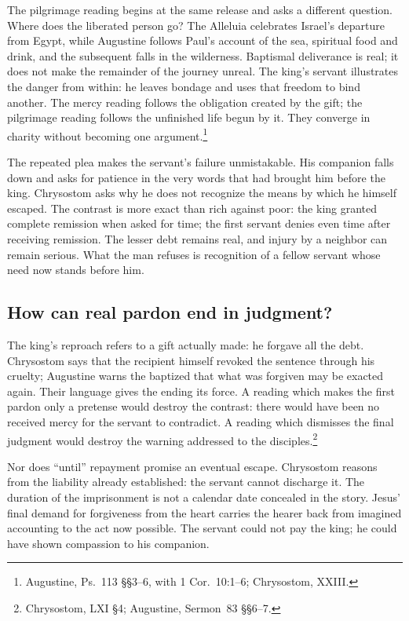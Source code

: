 The pilgrimage reading begins at the same release and asks a different question. Where does the liberated person go? The Alleluia celebrates Israel's departure from Egypt, while Augustine follows Paul's account of the sea, spiritual food and drink, and the subsequent falls in the wilderness. Baptismal deliverance is real; it does not make the remainder of the journey unreal. The king's servant illustrates the danger from within: he leaves bondage and uses that freedom to bind another. The mercy reading follows the obligation created by the gift; the pilgrimage reading follows the unfinished life begun by it. They converge in charity without becoming one argument.\footnote{Augustine, Ps.~113 \S\S3--6, with 1 Cor.~10:1--6; Chrysostom,  XXIII.}

The repeated plea makes the servant's failure unmistakable. His companion falls down and asks for patience in the very words that had brought him before the king. Chrysostom asks why he does not recognize the means by which he himself escaped. The contrast is more exact than rich against poor: the king granted complete remission when asked for time; the first servant denies even time after receiving remission. The lesser debt remains real, and injury by a neighbor can remain serious. What the man refuses is recognition of a fellow servant whose need now stands before him.

\subsection{How can real pardon end in judgment?}
The king's reproach refers to a gift actually made: he forgave all the debt. Chrysostom says that the recipient himself revoked the sentence through his cruelty; Augustine warns the baptized that what was forgiven may be exacted again. Their language gives the ending its force. A reading which makes the first pardon only a pretense would destroy the contrast: there would have been no received mercy for the servant to contradict. A reading which dismisses the final judgment would destroy the warning addressed to the disciples.\footnote{Chrysostom,  LXI \S4; Augustine, Sermon~83 \S\S6--7.}

Nor does ``until'' repayment promise an eventual escape. Chrysostom reasons from the liability already established: the servant cannot discharge it. The duration of the imprisonment is not a calendar date concealed in the story. Jesus' final demand for forgiveness from the heart carries the hearer back from imagined accounting to the act now possible. The servant could not pay the king; he could have shown compassion to his companion.

